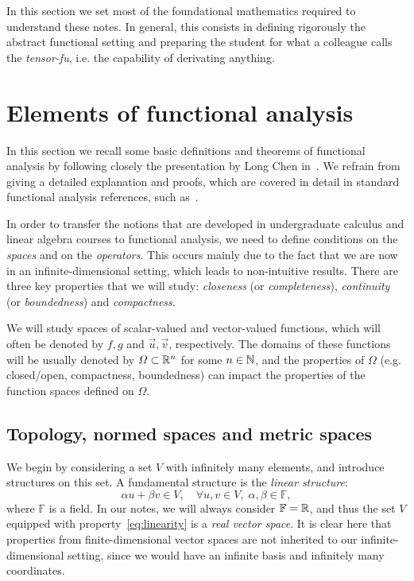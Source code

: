 In this section we set most of the foundational mathematics required to understand these notes. In general, this consists in defining rigorously the abstract functional setting and preparing the student for what a colleague calls the \emph{tensor-fu}, i.e. the capability of derivating anything.

\section{Elements of functional analysis}\label{sec:elements-functional-analysis}

In this section we recall some basic definitions and theorems of functional analysis by following closely the presentation by Long Chen in~\cite{chen2024infSup}. We refrain from giving a detailed explanation and proofs, which are covered in detail in standard functional analysis references, such as~\cite{BrezisFA}.

In order to transfer the notions that are developed in undergraduate calculus and linear algebra courses to functional analysis, we need to define conditions on the \emph{spaces} and on the \emph{operators}. This occurs mainly due to the fact that we are now in an infinite-dimensional setting, which leads to non-intuitive results. There are three key properties that we will study: \emph{closeness} (or \emph{completeness}), \emph{continuity} (or \emph{boundedness}) and \emph{compactness}.

We will study spaces of scalar-valued and vector-valued functions, which will often be denoted by $f, g$ and $\vec u, \vec v$, respectively. The domains of these functions will be usually denoted by $\Omega\subset\mathbb{R}^n$ for some $n\in\mathbb{N}$, and the properties of $\Omega$ (e.g. closed/open, compactness, boundedness) can impact the properties of the function spaces defined on $\Omega$.

\subsection{Topology, normed spaces and metric spaces}
We begin by considering a set $V$ with infinitely many elements, and introduce structures on this set. A fundamental structure is the \emph{linear structure}:
\begin{equation}\label{eq:linearity}
    \alpha u + \beta v \in V,\quad \forall u,v\in V, \; \alpha, \beta\in \mathbb{F},
\end{equation}
where $\mathbb{F}$ is a field. In our notes, we will always consider $\mathbb{F}=\mathbb{R}$, and thus the set $V$ equipped with property~\eqref{eq:linearity} is a \emph{real vector space}. It is clear here that properties from finite-dimensional vector spaces are not inherited to our infinite-dimensional setting, since we would have an infinite basis and infinitely many coordinates. 


